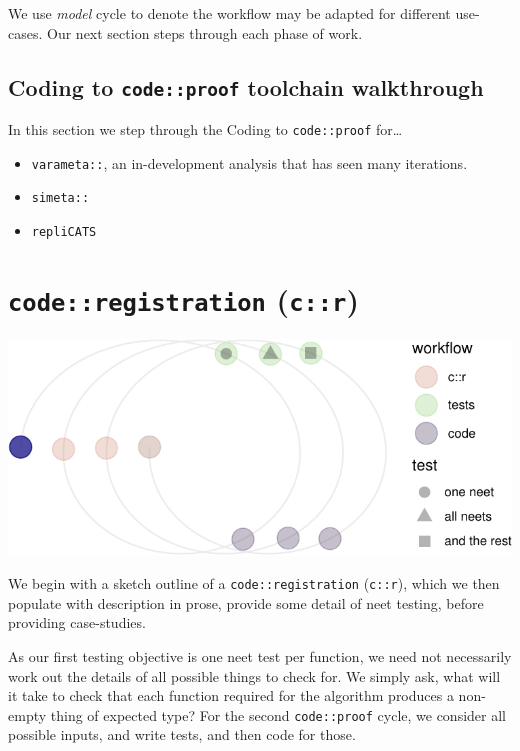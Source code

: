 \documentclass[
]{article}
\providecommand{\tightlist}{%
  \setlength{\itemsep}{0pt}\setlength{\parskip}{0pt}}
\begin{document}
We use \emph{model} cycle to denote the workflow may be adapted for different use-cases. Our next section steps through each phase of work.

\hypertarget{coding-to-codeproof-toolchain-walkthrough}{%
\subsection{\texorpdfstring{Coding to \texttt{code::proof} toolchain walkthrough}{Coding to code::proof toolchain walkthrough}}\label{coding-to-codeproof-toolchain-walkthrough}}

In this section we step through the Coding to \texttt{code::proof} for\ldots{}

\begin{itemize}
\tightlist
\item
  \texttt{varameta::}, an in-development analysis that has seen many iterations.\\
\item
  \texttt{simeta::}
\item
  \texttt{repliCATS}
\end{itemize}

\hypertarget{coderegistration-cr}{%
\section{\texorpdfstring{\texttt{code::registration} (\texttt{c::r})}{code::registration (c::r)}}\label{coderegistration-cr}}

\begin{center}\includegraphics{when-is-done-done_files/figure-latex/unnamed-chunk-3-1} \end{center}

We begin with a sketch outline of a \texttt{code::registration} (\texttt{c::r}), which we then populate with description in prose, provide some detail of neet testing, before providing case-studies.

As our first testing objective is one neet test per function, we need not necessarily work out the details of all possible things to check for. We simply ask, what will it take to check that each function required for the algorithm produces a non-empty thing of expected type? For the second \texttt{code::proof} cycle, we consider all possible inputs, and write tests, and then code for those.
\end{document}
